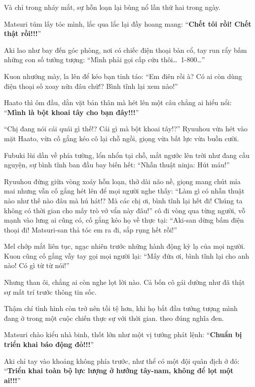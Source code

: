 \documentclass[../main.tex]{subfiles}
\begin{document}

Và chỉ trong nháy mắt, sự hỗn loạn lại bùng nổ lần thứ hai trong ngày.

Matsuri túm lấy tóc mình, lắc qua lắc lại đầy hoang mang: ``\textbf{Chết tôi rồi! Chết thật rồi!!!}''

Aki lao như bay đến góc phòng, nơi có chiếc điện thoại bàn cổ, tay run rẩy bấm những con số tưởng tượng: ``Mình phải gọi cấp cứu thôi\dots\ 1-800\dots''

Kuon nhướng mày, la lên để kéo bạn tỉnh táo: ``Em điên rồi à? Có ai còn dùng điện thoại số xoay nữa đâu chứ!? Bình tĩnh lại xem nào!''

Haato thì ôm đầu, dằn vặt bản thân mà hét lên một câu chẳng ai hiểu nổi: ``\textbf{Mình là bột khoai tây cho bạn đây!!!}''

``Chị đang nói cái quái gì thế!? Cái gì mà bột khoai tây!?'' Ryuuhou vừa hét vào mặt Haato, vừa cố gắng kéo cô lại chỗ ngồi, giọng vừa bất lực vừa buồn cười.

Fubuki lùi dần về phía tường, lổn nhổn tại chỗ, mắt ngước lên trời như đang cầu nguyện, sự bình tĩnh ban đầu bay biến hết: ``Nhẫn thuật ninja: Hút máu!''

Ryuuhou đứng giữa vòng xoáy hỗn loạn, thở dài não nề, giọng mang chút mỉa mai nhưng vẫn cố gắng hét lên để mọi người nghe thấy: ``Làm gì có nhẫn thuật nào như thế nào đâu mà hú hát!? Mà các chị ơi, bình tĩnh lại hết đi! Chúng ta không có thời gian cho mấy trò vớ vẩn này đâu!'' cô đi vòng qua từng người, vỗ mạnh vào lưng ai cũng có, cố gắng kéo họ về thực tại: ``Aki-san dừng bấm điện thoại đi! Matsuri-san thả tóc em ra đi, sắp rụng hết rồi!''

Mel chớp mắt liên tục, ngạc nhiên trước những hành động kỳ lạ của mọi người. Kuon cũng cố gắng vẫy tay gọi mọi người lại: ``Mấy đứa ơi, bình tĩnh lại cho anh nào! Có gì từ từ nói!''

Nhưng than ôi, chẳng ai còn nghe lọt lời nào. Cả bốn cô gái dường như đã thật sự mất trí trước thông tin sốc.


Thậm chí tình hình còn trở nên tồi tệ hơn, khi họ bắt đầu tưởng tượng mình đang ở trong một cuộc chiến thực sự với thời gian. theo đúng nghĩa đen.

Matsuri chào kiểu nhà binh, thốt lớn như một vị tướng phát lệnh: ``\textbf{Chuẩn bị triển khai báo động đỏ!!!}''

Aki chỉ tay vào khoảng không phía trước, như thể có một đội quân địch ở đó: ``\textbf{Triển khai toàn bộ lực lượng ở hướng tây-nam, không để lọt một ai!!!}''
\end{document}
